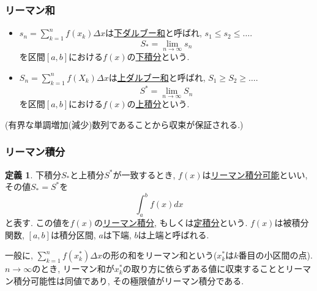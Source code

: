 \documentclass[dvipdfmx,cjk,10.2pt]{beamer}
\theoremstyle{definition}
\newtheorem{Def}[Thm]{定義}
\begin{document}


\begin{frame}
\frametitle{リーマン和}

\begin{itemize}
\item $s_n=\sum_{k=1}^nf(x_k)\Delta x$は\underline{下ダルブー和}と呼ばれ, $s_1 \le s_2 \le \dots$. 
$$S_*=\lim_{n \to \infty} s_n$$
を区間$[a,b]$における$f(x)$の\underline{下積分}という. 
\item $S_n=\sum_{k=1}^nf(X_k)\Delta x$は\underline{上ダルブー和}と呼ばれ, $S_1 \ge S_2 \ge \dots$. 
$$S^*=\lim_{n \to \infty} S_n$$
を区間$[a,b]$における$f(x)$の\underline{上積分}という. 
\end{itemize}
(有界な単調増加(減少)数列であることから収束が保証される.)

\end{frame}





\begin{frame}
\frametitle{リーマン積分}


\begin{Def}
下積分$S_*$と上積分$S^*$が一致するとき, $f(x)$は\underline{リーマン積分可能}といい, その値$S_*=S^*$を
$$
\int_a^b f(x)dx
$$
と表す. この値を$f(x)$の\underline{リーマン積分}, もしくは\underline{定積分}という. 
$f(x)$は被積分関数, $[a,b]$は積分区間, $a$は下端, $b$は上端と呼ばれる. 
\end{Def}

一般に, $\sum_{k=1}^nf(x_k^*)\Delta x$の形の和をリーマン和という($x_k^*$は$k$番目の小区間の点). 
$n \to \infty$のとき, リーマン和が$x_k^*$の取り方に依らずある値に収束することとリーマン積分可能性は同値であり, 
その極限値がリーマン積分である.  

\end{frame}


\end{document}
